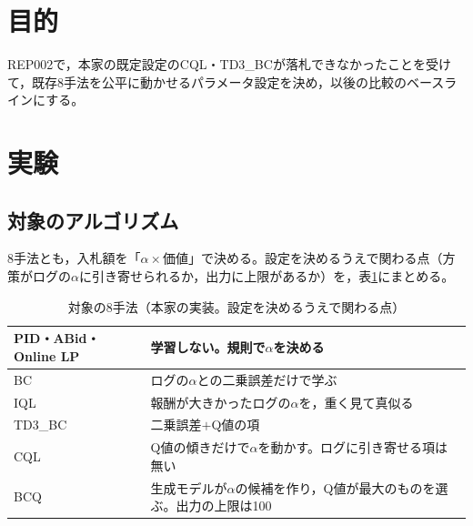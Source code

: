 \documentclass[twocolumn, 10pt]{ujarticle}
\begin{document}
\beginverification

\section{目的}\label{sec:e-purpose}

REP002で，本家の既定設定のCQL・TD3\_BCが落札できなかったことを受けて，既存8手法を公平に動かせるパラメータ設定を決め，以後の比較のベースラインにする。

\section{実験}\label{sec:e-exp}

\subsection{対象のアルゴリズム}\label{sec:e-algo}

8手法とも，入札額を「$\alpha\times$価値」で決める。設定を決めるうえで関わる点（方策がログの$\alpha$に引き寄せられるか，出力に上限があるか）を，表\ref{tab:algo}にまとめる。

\begin{table}[H]
\centering
\caption{対象の8手法（本家の実装。設定を決めるうえで関わる点）}
\label{tab:algo}
\footnotesize
\begin{tabularx}{\linewidth}{@{}l>{\raggedright\arraybackslash}X@{}}
\toprule
PID・ABid・Online LP & 学習しない。規則で$\alpha$を決める \\
\midrule
BC & ログの$\alpha$との二乗誤差だけで学ぶ \\
IQL & 報酬が大きかったログの$\alpha$を，重く見て真似る \\
TD3\_BC & 二乗誤差$+$Q値の項 \\
CQL & Q値の傾きだけで$\alpha$を動かす。ログに引き寄せる項は無い \\
BCQ & 生成モデルが$\alpha$の候補を作り，Q値が最大のものを選ぶ。出力の上限は100 \\
\bottomrule
\end{tabularx}
\end{table}
\end{document}
